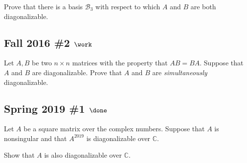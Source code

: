 Prove that there is a basis \({\mathcal{B}}_3\) with respect to which
\(A\) and \(B\) are both diagonalizable.

\hypertarget{fall-2016-2-work}{%
\subsection{\texorpdfstring{Fall 2016 \#2
\(\work\)}{Fall 2016 \#2 \textbackslash work}}\label{fall-2016-2-work}}

Let \(A, B\) be two \(n\times n\) matrices with the property that
\(AB = BA\). Suppose that \(A\) and \(B\) are diagonalizable. Prove that
\(A\) and \(B\) are \emph{simultaneously} diagonalizable.

\hypertarget{spring-2019-1-done}{%
\subsection{\texorpdfstring{Spring 2019 \#1
\(\done\)}{Spring 2019 \#1 \textbackslash done}}\label{spring-2019-1-done}}

Let \(A\) be a square matrix over the complex numbers. Suppose that
\(A\) is nonsingular and that \(A^{2019}\) is diagonalizable over
\({\mathbb{C}}\).

Show that \(A\) is also diagonalizable over \({\mathbb{C}}\).

